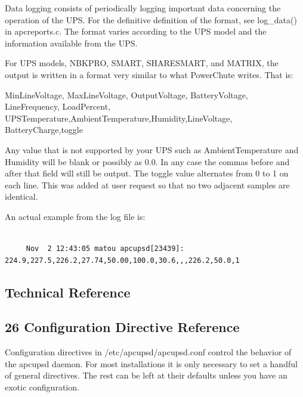 {{{{{{{{{{Data logging consists of periodically logging important data concerning the
operation of the UPS. For the definitive definition of the format, see
log\_data() in apcreports.c. The format varies according to the UPS model and
the information available from the UPS.  

For UPS models, NBKPRO, SMART, SHARESMART, and MATRIX, the output is written
in a format very similar to what PowerChute writes. That is:  

MinLineVoltage, MaxLineVoltage, OutputVoltage, BatteryVoltage, LineFrequency,
LoadPercent, UPSTemperature,AmbientTemperature,Humidity,LineVoltage,
BatteryCharge,toggle  

Any value that is not supported by your UPS such as AmbientTemperature and
Humidity will be blank or possibly as 0.0. In any case the commas before and
after that field will still be output. The toggle value alternates from 0 to 1
on each line. This was added at user request so that no two adjacent samples
are identical.  

An actual example from the log file is: 

\footnotesize
\begin{verbatim}
     
     Nov  2 12:43:05 matou apcupsd[23439]: 224.9,227.5,226.2,27.74,50.00,100.0,30.6,,,226.2,50.0,1
\end{verbatim}
\normalsize

\label{Technical-Reference}

\subsection*{Technical Reference}

\label{index-Technical-Reference-235}

\label{Configuration-Directive-Reference}

\subsection*{26 Configuration Directive Reference}

\label{index-Reference_002c-Directives-236}
\label{index-Configuration_002c-Directives-237}
\label{index-Directives-238}
Configuration directives in /etc/apcupsd/apcupsd.conf control the behavior of
the apcupsd daemon.  For most installations it is only necessary to set a
handful of general directives. The rest can be left at their defaults unless
you have an exotic configuration. 

}}}}}}}}}}

